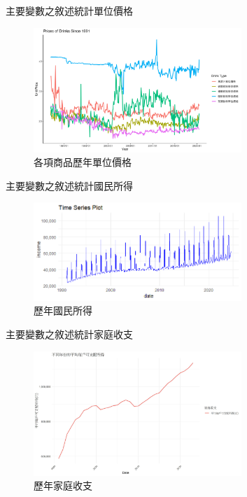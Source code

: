 \documentclass[12pt]{beamer}
\begin{document}
\begin{frame}{主要變數之敘述統計}{單位價格}
	\begin{figure}
 		\centering
		\includegraphics[width=0.7\textwidth]{figures/drinks_prices_plot.jpg}
		\caption{各項商品歷年單位價格}
	\end{figure}
\end{frame}

\begin{frame}{主要變數之敘述統計}{國民所得}
	\begin{figure}
		 
  		\centering
		\includegraphics[width=0.7\textwidth]{figures/國民所得.png}
		\caption{歷年國民所得}
	\end{figure}
\end{frame}

\begin{frame}{主要變數之敘述統計}{家庭收支}
	\begin{figure}
		 
 		\centering
		\includegraphics[width=0.7\textwidth]{figures/家庭收支.jpg}
		\caption{歷年家庭收支}
	\end{figure}
\end{frame}
\end{document}
